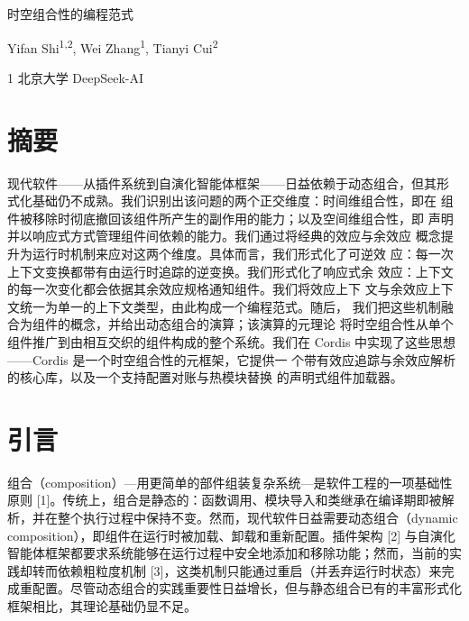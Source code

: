 \documentclass[
  10
]{article}
\author{}
\date{}
\begin{document}
\begin{center}
{\LARGE 时空组合性的编程范式\par}
\vspace{0.6em}
{\normalsize Yifan Shi\textsuperscript{1,2}, Wei Zhang\textsuperscript{1}, Tianyi Cui\textsuperscript{2}\par}
\vspace{0.4em}
{\small 1 北京大学  DeepSeek-AI\par}
\end{center}
\label{a-programming-paradigm-for-spatiotemporal-composability}

\section*{摘要} \label{abstract}

现代软件——从插件系统到自演化智能体框架——日益依赖于动态组合，但其形
式化基础仍不成熟。我们识别出该问题的两个正交维度：时间维组合性，即在
组件被移除时彻底撤回该组件所产生的副作用的能力；以及空间维组合性，即
声明并以响应式方式管理组件间依赖的能力。我们通过将经典的效应与余效应
概念提升为运行时机制来应对这两个维度。具体而言，我们形式化了可逆效
应：每一次上下文变换都带有由运行时追踪的逆变换。我们形式化了响应式余
效应：上下文的每一次变化都会依据其余效应规格通知组件。我们将效应上下
文与余效应上下文统一为单一的上下文类型，由此构成一个编程范式。随后，
我们把这些机制融合为组件的概念，并给出动态组合的演算；该演算的元理论
将时空组合性从单个组件推广到由相互交织的组件构成的整个系统。我们在
Cordis 中实现了这些思想——Cordis 是一个时空组合性的元框架，它提供一
个带有效应追踪与余效应解析的核心库，以及一个支持配置对账与热模块替换
的声明式组件加载器。

\renewcommand{\contentsname}{目录}
\tableofcontents

\section{引言} \label{introduction}

组合（composition）---用更简单的部件组装复杂系统---是软件工程的一项基础性原则 {[}1{]}。传统上，组合是静态的：函数调用、模块导入和类继承在编译期即被解析，并在整个执行过程中保持不变。然而，现代软件日益需要动态组合（dynamic composition），即组件在运行时被加载、卸载和重新配置。插件架构 {[}2{]} 与自演化智能体框架都要求系统能够在运行过程中安全地添加和移除功能；然而，当前的实践却转而依赖粗粒度机制 {[}3{]}，这类机制只能通过重启（并丢弃运行时状态）来完成重配置。尽管动态组合的实践重要性日益增长，但与静态组合已有的丰富形式化框架相比，其理论基础仍显不足。
\end{document}
